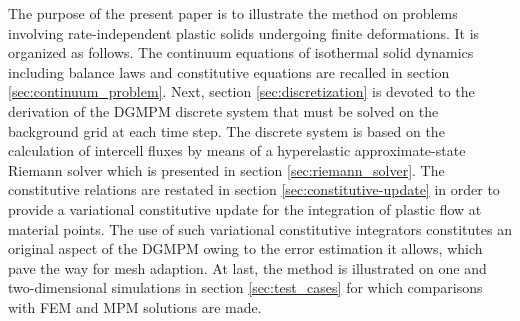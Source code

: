 The purpose of the present paper is to illustrate the method on problems involving rate-independent plastic solids undergoing finite deformations.
It is organized as follows.
The continuum equations of isothermal solid dynamics including balance laws and constitutive equations are recalled in section \ref{sec:continuum_problem}.
Next, section \ref{sec:discretization} is devoted to the derivation of the DGMPM discrete system that must be solved on the background grid at each time step. 
The discrete system is based on the calculation of intercell fluxes by means of a hyperelastic approximate-state Riemann solver which is presented in section \ref{sec:riemann_solver}.
The constitutive relations are restated in section \ref{sec:constitutive-update} in order to provide a variational constitutive update \cite{Laurent99} for the integration of plastic flow at material points.
The use of such variational constitutive integrators constitutes an original aspect of the DGMPM owing to the error estimation it allows, which pave the way for mesh adaption.
At last, the method is illustrated on one and two-dimensional simulations in section \ref{sec:test_cases} for which comparisons with FEM and MPM solutions are made.


